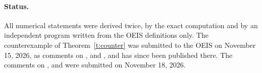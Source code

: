 \paragraph{Status.} All numerical statements were derived twice, by the exact computation and by an
independent program written from the OEIS definitions only. The counterexample of Theorem~\ref{t:counter}
was submitted to the OEIS on November 15, 2026, as comments on ,  and
, and has since been published there. The comments on ,  and
 were submitted on November 18, 2026.

